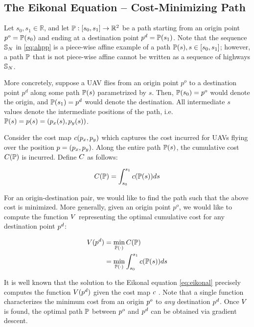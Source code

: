 \subsection{The Eikonal Equation -- Cost-Minimizing Path}
Let $s_0, s_1\in \mathbb{R}$, and let $\mathbb{P}: [s_0, s_1] \rightarrow \mathbb{R}^2$ be a path starting from an origin point $p^o = \mathbb{P}(s_0)$ and ending at a destination point $p^d = \mathbb{P}(s_1)$. Note that the sequence $\mathbb{S}_N$ in \eqref{eq:ahpp} is a piece-wise affine example of a path $\mathbb{P}(s), s\in[s_0, s_1]$; however, a path $\mathbb{P}$ that is not piece-wise affine cannot be written as a sequence of highways $\mathbb{S}_N$.

More concretely, suppose a UAV flies from an origin point $p^o$ to a destination point $p^d$ along some path $\mathbb{P}(s)$ parametrized by $s$. Then, $\mathbb{P}(s_0) = p^o$ would denote the origin, and $\mathbb{P}(s_1) = p^d$ would denote the destination. All intermediate $s$ values denote the intermediate positions of the path, i.e. $\mathbb{P}(s) = p(s) = (p_x(s), p_y(s))$.

Consider the cost map $c(p_x, p_y)$ which captures the cost incurred for UAVs flying over the position $p = (p_x, p_y)$. Along the entire path $\mathbb{P}(s)$, the cumulative cost $C(\mathbb{P})$ is incurred. Define $C$ as follows:

\begin{equation}
C(\mathbb{P}) = \int_{s_0}^{s_1} c(\mathbb{P}(s)) ds
\end{equation}

For an origin-destination pair, we would like to find the path such that the above cost is minimized. More generally, given an origin point $p^o$, we would like to compute the function $V$ representing the optimal cumulative cost for any destination point $p^d$:

\begin{equation}
\label{eq:rahpp} %
\begin{aligned}
\ocost(\pos^d) &= \min_{\ppath(\cdot)} \ccost(\ppath) \\
&= \min_{\ppath(\cdot)} \int_{s_0}^{s_1} \cmap(\ppath(s)) ds
\end{aligned}
\end{equation}

It is well known that the solution to the Eikonal equation \eqref{eq:eikonal} precisely computes the function $V(p^d)$ given the cost map $c$ \cite{Sethian96,Alton06}. Note that a single function characterizes the minimum cost from an origin $p^o$ to \textit{any} destination $p^d$. Once $V$ is found, the optimal path $\mathbb{P}$ between $p^o$ and $p^d$ can be obtained via gradient descent.

